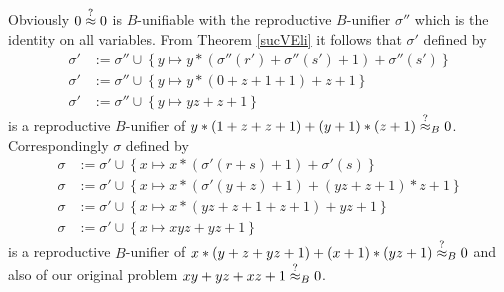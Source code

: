 	Obviously $0\stackrel{?}{\approx}0$ is $B$-unifiable with the reproductive $B$-unifier $\sigma''$ which is the identity on all variables. From Theorem \ref{sucVEli} it follows that $\sigma'$ defined by
	\begin{align*}
		\sigma' & :=\sigma''\cup\left\lbrace y\mapsto y*(\sigma''(r')+\sigma''(s')+1)+\sigma''(s')\right\rbrace \\
		\sigma' & :=\sigma''\cup\left\lbrace y\mapsto y*(0+z+1+1)+z+1\right\rbrace                              \\
		\sigma' & :=\sigma''\cup\left\lbrace y\mapsto yz+z+1\right\rbrace                                       
	\end{align*}
	is a reproductive $B$-unifier of $y*(1+z+z+1)+(y+1)*(z+1)\stackrel{?}{\approx}_B0$. Correspondingly $\sigma$ defined by
	\begin{align*}
		\sigma & :=\sigma'\cup\left\lbrace x\mapsto x*(\sigma'(r+s)+1)+\sigma'(s)\right\rbrace   \\
		\sigma & :=\sigma'\cup\left\lbrace x\mapsto x*(\sigma'(y+z)+1)+(yz+z+1)*z+1\right\rbrace \\
		\sigma & :=\sigma'\cup\left\lbrace x\mapsto x*(yz+z+1+z+1)+yz+1\right\rbrace             \\
		\sigma & :=\sigma'\cup\left\lbrace x\mapsto xyz+yz+1\right\rbrace                        
	\end{align*}
	is a reproductive $B$-unifier of $x*(y+z+yz+1)+(x+1)*(yz+1)\stackrel{?}{\approx}_B0$ and also of our original problem $xy+yz+xz+1\stackrel{?}{\approx}_B0$.
